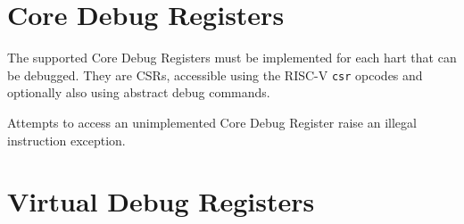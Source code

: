 \section{Core Debug Registers} \label{debreg}

The supported Core Debug Registers must be implemented for each hart that can
be debugged. They are CSRs, accessible using the RISC-V {\tt csr} opcodes and
optionally also using abstract debug commands.

Attempts to access an unimplemented Core Debug Register raise an illegal
instruction exception.



\section{Virtual Debug Registers} \label{virtreg}


